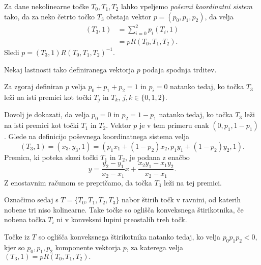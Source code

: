\documentclass[mat1]{fmfdelo}
\begin{document}









Za dane nekolinearne točke $T_0, T_1, T_2$ lahko vpeljemo \emph{poševni koordinatni sistem} tako, da za neko četrto točko $T_3$ obstaja vektor $p = (p_0, p_1, p_2)$, da velja
\begin{align*}
(T_3, 1) &= \sum_{i=0}^{2} p_i (T_i, 1) \\
	   & = p R(T_0, T_1, T_2).
	   \end{align*}
Sledi $ p = (T_3, 1) R(T_0, T_1, T_2)^{-1}$.

Nekaj lastnosti tako definiranega vektorja $p$ podaja spodnja trditev.

\begin{trditev}\label{vektorp}
Za zgoraj definiran $p$ velja $p_0 + p_1 + p_2 = 1$ in $p_i = 0$ natanko tedaj, ko točka $T_3$ leži na isti premici kot točki $T_j$ in $T_k$, $j, k \in \{0, 1, 2 \}$. 
\end{trditev}

\begin{dokaz}

Dovolj je dokazati, da velja $p_0 = 0$ in $p_2 = 1- p_1$ natanko tedaj, ko točka $T_3$ leži na isti premici kot točki $T_1$ in $T_2$.
Vektor $p$ je v tem primeru enak $(0, p_1, 1-p_1)$. Glede na definicijo poševnega koordinatnega sistema velja
$$(T_3, 1) = (x_3, y_3, 1) = (p_1 x_1 + (1-p_2)x_2, p_1 y_1 + (1- p_2) y_2, 1).$$
Premica, ki poteka skozi točki $T_1$ in $T_2$, je podana z enačbo
$$ y = \frac{y_2 - y_1}{x_2 - x_1} x + \frac{x_2 y_1 - x_1 y_2}{x_2 - x_1} .$$
Z enostavnim računom se prepričamo, da točka $T_3$ leži na tej premici.

\end{dokaz}

Označimo sedaj s $T = \{T_0, T_1, T_2, T_3 \}$ nabor štirih točk v ravnini, od katerih nobene tri niso kolinearne. Take točke so oglišča konveksnega štirikotnika, če nobena točka $T_i$ ni v konveksni lupini preostalih treh točk.

\begin{trditev}\label{konveks}
Točke iz $T$ so oglišča konveksnega štirikotnika natanko tedaj, ko velja $p_0 p_1 p_2 < 0$, kjer so $p_0, p_1, p_2$ komponente vektorja $p$, za katerega velja $(T_3, 1) = p R(T_0, T_1, T_2).$
\end{trditev}
\end{document}

